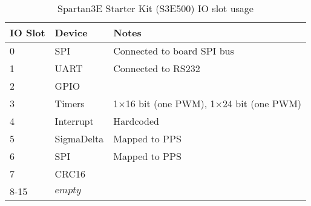 \begin{table}[H]
\begin{center}
\begin{tabularx}{14cm}{llX}
IO Slot & Device & Notes \\
\hline
0 & SPI & Connected to board SPI bus \\
1 & UART & Connected to RS232 \\
2 & GPIO & \\
3 & Timers & 1$\times$16 bit (one PWM), 1$\times$24 bit (one PWM) \\
4 & Interrupt & Hardcoded \\
5 & SigmaDelta & Mapped to PPS \\
6 & SPI & Mapped to PPS \\
7 & CRC16 & \\
8-15 & $empty$ &
\end{tabularx}
\caption{Spartan3E Starter Kit (S3E500) IO slot usage}
\end{center}
\end{table}
